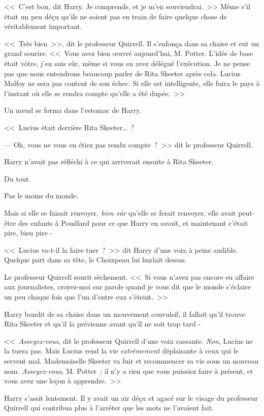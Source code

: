 <<~C'est bon, dit Harry. Je comprends, et je m'en souviendrai.~>> Même s'il était un peu déçu qu'ils ne soient pas en train de faire quelque chose de véritablement important.

<<~Très bien~>>, dit le professeur Quirrell. Il s'enfonça dans sa chaise et eut un grand sourire. <<~Vous avez bien œuvré aujourd'hui, M. Potter. L'idée de base était vôtre, j'en suis sûr, même si vous en avez délégué l'exécution. Je ne pense pas que nous entendrons beaucoup parler de Rita Skeeter après cela. Lucius Malfoy ne sera pas content de son échec. Si elle est intelligente, elle fuira le pays à l'instant où elle se rendra compte qu'elle a été dupée.~>>

Un nœud se forma dans l'estomac de Harry.

<<~Lucius était derrière Rita Skeeter…~?

--- Oh, vous ne vous en étiez pas rendu compte~?~>> dit le professeur Quirrell.

Harry n'avait pas réfléchi à ce qui arriverait ensuite à Rita Skeeter.

Du tout.

Pas le moins du monde.

Mais si elle se faisait renvoyer, \emph{bien sûr} qu'elle se ferait renvoyer, elle avait peut-être des enfants à Poudlard pour ce que Harry en savait, et maintenant c'était pire, bien pire -

<<~Lucius va-t-il la faire tuer~?~>> dit Harry d'une voix à peine audible. Quelque part dans sa tête, le Choixpeau lui hurlait dessus.

Le professeur Quirrell sourit sèchement. <<~Si vous n'avez pas encore eu affaire aux journalistes, croyez-moi sur parole quand je vous dit que le monde s'éclaire un peu chaque fois que l'un d'entre eux s'éteint.~>>

Harry bondit de sa chaise dans un mouvement convulsif, il fallait qu'il trouve Rita Skeeter et qu'il la prévienne avant qu'il ne soit trop tard -

<<~\emph{Asseyez-vous}, dit le professeur Quirrell d'une voix cassante. \emph{Non}, Lucius ne la tuera pas. Mais Lucius rend la vie \emph{extrêmement} déplaisante à ceux qui le servent mal. Mademoiselle Skeeter va fuir et recommencer sa vie sous un nouveau nom. \emph{Asseyez-vous}, M. Potter~; il n'y a rien que vous puissiez faire à présent, et vous avez une leçon à apprendre.~>>

Harry s'assit lentement. Il y avait un air déçu et agacé sur le visage du professeur Quirrell qui contribua plus à l'arrêter que les mots ne l'avaient fait.

